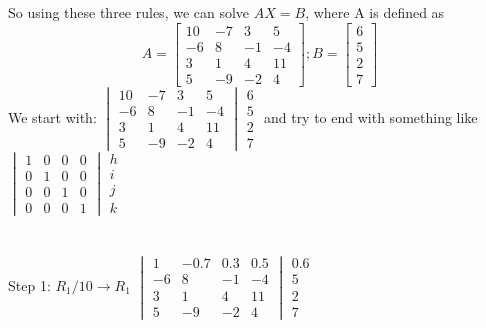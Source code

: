 \documentclass{article}
\begin{document}
So using these three rules, we can solve $AX=B$, where A is defined as
$$A = \begin{bmatrix}
  10 & -7 & 3 & 5\\
  -6 & 8 & -1 & -4 \\
  3&1&4&11 \\
  5&-9&-2&4

\end{bmatrix};
B =
\begin{bmatrix}
6\\
5\\
2\\
7 \end{bmatrix}$$
We start with:
$\begin{vmatrix}
10 & -7 & 3 & 5\\
-6 & 8 & -1 & -4 \\
3&1&4&11 \\
5&-9&-2&4
\end{vmatrix}\begin{matrix}
6\\
5\\
2\\
7 \end{matrix} $ and try to end with something like $\begin{vmatrix}
1 & 0 & 0 & 0\\
0 & 1 & 0 & 0 \\
0&0&1&0 \\
0&0&0&1
\end{vmatrix}\begin{matrix}
h\\
i\\
j\\
k \end{matrix} $ \\ \\ \\
Step 1: $R_1 /10 \rightarrow R_1$
$\begin{vmatrix}
1 & -0.7 & 0.3 & 0.5\\
-6 & 8 & -1 & -4 \\
3&1&4&11 \\
5&-9&-2&4
\end{vmatrix}\begin{matrix}
0.6\\
5\\
2\\
7 \end{matrix} $
\\ \\ \\
$$
\end{document}
